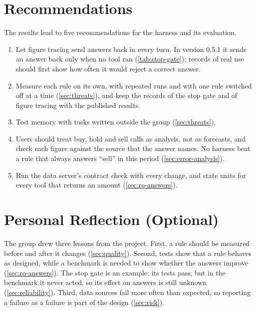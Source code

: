 \section{Recommendations}\label{sec:recommendations}
The results lead to five recommendations for the harness and its evaluation.
\begin{enumerate}
  \item Let figure tracing send answers back in every turn.
  In version 0.5.1 it sends an answer back only when no tool ran (\cref{tab:stop-gate}); records of real use should first show how often it would reject a correct answer.
  \item Measure each rule on its own, with repeated runs and with one rule switched off at a time (\cref{sec:threats}), and keep the records of the stop gate and of figure tracing with the published results.
  \item Test memory with tasks written outside the group (\cref{sec:threats}).
  \item Users should treat buy, hold and sell calls as analysis, not as forecasts, and check each figure against the source that the answer names.
  No harness beat a rule that always answers \enquote{sell} in this period (\cref{sec:error-analysis}).
  \item Run the data server's contract check with every change, and state units for every tool that returns an amount (\cref{sec:rq-answers}).
\end{enumerate}

\section{Personal Reflection (Optional)}\label{sec:reflection}
The group drew three lessons from the project.
First, a rule should be measured before and after it changes (\cref{sec:quality}).
Second, tests show that a rule behaves as designed, while a benchmark is needed to show whether the answers improve (\cref{sec:rq-answers}).
The stop gate is an example: its tests pass, but in the benchmark it never acted, so its effect on answers is still unknown (\cref{sec:reliability}).
Third, data sources fail more often than expected, so reporting a failure as a failure is part of the design (\cref{sec:risk}).
